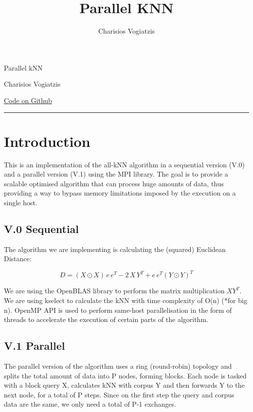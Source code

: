 \documentclass[12pt, letterpaper]{article}
\title{Parallel KNN}
\author{Charisios Vogiatzis}
\begin{document}
\maketitle
\begin{center}
    \huge{Parallel kNN}
    
    \large{Charisios Vogiatzis}
\end{center}

\href{https://github.com/charisvt/PDS-KNN}{Code on Github}\\

\rule{\textwidth}{0.5pt}

\section{Introduction}
This is an implementation of the all-kNN algorithm in a sequential version (V.0) and a parallel version (V.1) using the MPI library. 
The goal is to provide a scalable optimised algorithm that can process huge amounts of data, thus providing a way to bypass memory limitations imposed by the execution on a single host.

\subsection{V.0 Sequential}
The algorithm we are implementing is calculating the (squared) Euclidean Distance: 

\begin{equation}
    D = (X \odot X)\, e\, e^{T} - 2\, X\, Y^{T} + e\, e^{T}(Y \odot Y)^{T}
\end{equation}

We are using the OpenBLAS library to perform the matrix multiplication $XY^{T}$.\\
We are using kselect to calculate the kNN with time complexity of O(n) (*for big n).
OpenMP API is used to perform same-host parallelisation in the form of threads to accelerate the execution of certain parts of the algorithm.


\subsection{V.1 Parallel}
The parallel version of the algorithm uses a ring (round-robin) topology and splits the total amount of data into P nodes, forming blocks. 
Each node is tasked with a block query X, calculates kNN with corpus Y and then forwards Y to the next node, for a total of P steps. 
Since on the first step the query and corpus data are the same, we only need a total of P-1 exchanges.
\end{document}
